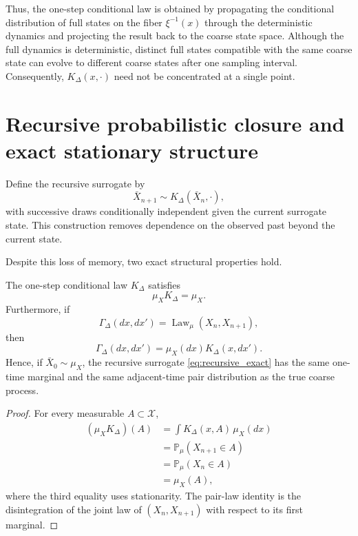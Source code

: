 \documentclass[final,hidelinks]{siamart251216}
\newcommand{\cX}{\mathcal{X}}
\newcommand{\Law}{\operatorname{Law}}
\newcommand{\Prob}{\mathbb{P}}
\begin{document}
Thus, the one-step conditional law is obtained by propagating the
conditional distribution of full states on the fiber $\xi^{-1}(x)$ through
the deterministic dynamics and projecting the result back to the coarse
state space. Although the full dynamics is deterministic, distinct full
states compatible with the same coarse state can evolve to different coarse
states after one sampling interval. Consequently, $K_\Delta(x,\cdot)$ need
not be concentrated at a single point.

\section{Recursive probabilistic closure and exact stationary structure}
\label{sec:recursive}

Define the recursive surrogate by
\begin{equation}
    \bar X_{n+1}\sim K_\Delta(\bar X_n,\cdot),
    \label{eq:recursive_exact}
\end{equation}
with successive draws conditionally independent given the current
surrogate state. This construction removes dependence on the observed
past beyond the current state.

Despite this loss of memory, two exact structural properties hold.

\begin{theorem}
\label{thm:preservation}
The one-step conditional law $K_\Delta$ satisfies
\begin{equation}
\boxed{
    \mu_XK_\Delta=\mu_X.
}
    \label{eq:invariant_mu}
\end{equation}
Furthermore, if
\begin{equation}
    \Gamma_\Delta(dx,dx')
    =\Law_\mu(X_n,X_{n+1}),
    \label{eq:true_pair_law}
\end{equation}
then
\begin{equation}
\boxed{
    \Gamma_\Delta(dx,dx')
    =\mu_X(dx)K_\Delta(x,dx').
}
    \label{eq:pair_factorization}
\end{equation}
Hence, if $\bar X_0\sim\mu_X$, the recursive surrogate \eqref{eq:recursive_exact} has the same one-time marginal and the same adjacent-time pair distribution as the true coarse process.
\end{theorem}

\begin{proof}
For every measurable $A\subset\cX$,
\begin{align}
    (\mu_XK_\Delta)(A)
    &=\int K_\Delta(x,A)\,\mu_X(dx)\\
    &=\Prob_\mu(X_{n+1}\in A)\\
    &=\Prob_\mu(X_n\in A)\\
    &=\mu_X(A),
\end{align}
where the third equality uses stationarity.  The pair-law identity is the disintegration of the joint law of $(X_n,X_{n+1})$ with respect to its first marginal.
\end{proof}
\end{document}
